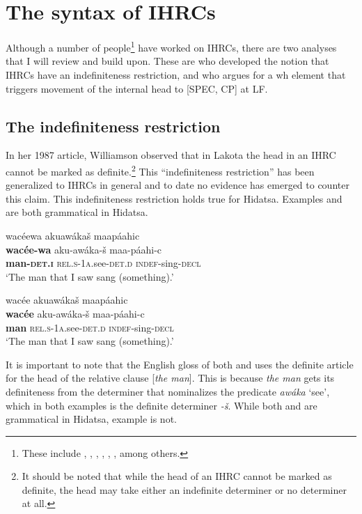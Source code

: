 \documentclass[output=paper]{LSP/langsci}
\begin{document}
\section{The syntax of IHRCs}\label{sec:boyle:4}

Although a number of people\footnote{These include \citet{HalePlatero1974}, \citet{Gorbet1976}, \citet{Fauconnier1979}, \citealt{Cole1987}, \citet{Culy1990}, \citet{Kayne1994} \citet{Bianchi1999}, \citet{Citko2001} among others.} have worked on IHRCs, there are two analyses that I will review and build upon. These are \citet{Williamson1987} who developed the notion that IHRCs have an indefiniteness restriction, and \citet{Culy1990} who argues for a wh element that triggers movement of the internal head to [SPEC, CP] at LF.

\subsection{The indefiniteness restriction}\label{sec:boyle:4.1}

In her 1987 article, Williamson observed that in Lakota the head in an IHRC cannot be marked as definite.\footnote{It should be noted that while the head of an IHRC cannot be marked as definite, the head may take either an indefinite determiner or no determiner at all.} This ``indefiniteness restriction'' has been generalized to IHRCs in general and to date no evidence has emerged to counter this claim. This indefiniteness restriction holds true for Hidatsa.  Examples  and  are both grammatical in Hidatsa.

\ea  \label{boyle13}
\glll wac\'eewa akuaw\'aka\v{s} maap\'aahic\\
\textbf{wac\'ee-wa}     aku-aw\'aka-\v{s}       maa-p\'aahi-c\\
\textbf{man-\textsc{det.i}} \textsc{rel.s-1a}.see-\textsc{det.d} \textsc{indef}-sing-\textsc{decl}\\ 
\trans `The man that I saw sang (something).' 
\z

\ea \label{boyle14}
\glll wac\'ee akuaw\'aka\v{s} maap\'aahic\\
\textbf{wac\'ee}  aku-aw\'aka-\v{s} maa-p\'aahi-c\\
\textbf{man} \textsc{rel.s-1a}.see-\textsc{det.d} \textsc{indef}-sing-\textsc{decl}\\
\trans `The man that I saw sang (something).' 
\z

It is important to note that the English gloss of both  and  uses the definite article for the head of the relative clause [\textit{the man}]. This is because \textit{the man} gets its definiteness from the determiner that nominalizes the predicate \textit{aw\'aka} `see', which in both examples is the definite determiner \textit{-\v{s}}. While both  and  are grammatical in Hidatsa, example  is not.
\end{document}
